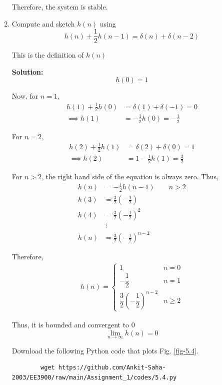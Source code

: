 \documentclass[journal,12pt,twocolumn]{IEEEtran}
\newcommand{\solution}{\noindent \textbf{Solution: }}
\providecommand{\brak}[1]{\ensuremath{\left(#1\right)}}
\numberwithin{equation}{section}
\renewcommand\thesection{\arabic{section}}
\begin{document}
\begin{enumerate}[label=\thesection.\arabic*]
	Therefore, the system is stable.
	
	\item Compute and sketch $h(n)$ using 
	\begin{equation}
		\label{eq:iir_filter_h}
		h(n) + \frac{1}{2}h(n-1) = \delta(n) + \delta(n-2)
	\end{equation}

	This is the definition of $h(n)$
	
	\solution 
	\begin{equation}
		h(0) = 1
	\end{equation}
	
	Now, for $n = 1$,
	\begin{align}
		h(1) + \frac12 h(0) &= \delta(1) + \delta(-1) = 0 \\
		\implies h(1) &= - \frac{1}{2} h(0) = -\frac{1}{2}
	\end{align}
	
	For $n = 2$,
	\begin{align}
		h(2) + \frac12 h(1) &= \delta(2) + \delta(0) = 1 \\
		\implies h(2) &= 1 - \frac{1}{2} h(1) = \frac{3}{2}
	\end{align}
	
	For $n > 2$, the right hand side of the equation is always zero. Thus,
	\begin{align}
		h(n) &= -\frac{1}{2} h(n-1) \qquad n > 2 \\
		h(3) &= \frac{3}{2} \brak{-\frac12} \\
		h(4) &= \frac{3}{2} \brak{-\frac12}^2 \\
		&~\vdots \\
		h(n) &= \frac{3}{2} \brak{-\frac12}^{n-2}
	\end{align}
	
	Therefore,
	\begin{align}
		h(n) = 
		\begin{cases}
			1 & n = 0 \\
			-\dfrac{1}{2} & n = 1 \\
			\dfrac{3}{2} \brak{-\dfrac12}^{n-2} & n \ge 2
		\end{cases}
	\end{align}
	
	Thus, it is bounded and convergent to $0$
	\begin{equation}
		\lim_{n \to \infty} h(n) = 0
	\end{equation}
	
	Download the following Python code that plots Fig. \ref{fig-5.4}.
	\begin{lstlisting}
		wget https://github.com/Ankit-Saha-2003/EE3900/raw/main/Assignment_1/codes/5.4.py
	\end{lstlisting}
	

\end{enumerate}
\end{document}
